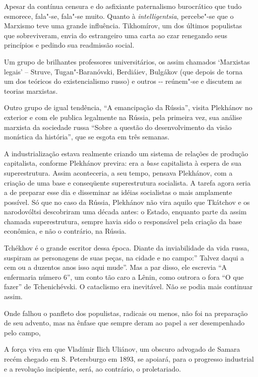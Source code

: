 Apesar da contínua censura e do asfixiante paternalismo burocrático que
tudo esmorece, fala"-se, fala"-se muito. Quanto à \emph{intelligentsia},
percebe"-se que o Marxismo teve uma grande influência. Tikhomírov, um dos
últimos populistas que sobreviveram, envia do estrangeiro uma carta ao
czar renegando seus princípios e pedindo sua readmissão social.

Um grupo de brilhantes professores universitários, os assim chamados
`Marxistas legais' -- Struve, Tugan"-Baranóvski, Berdiáiev, Bulgákov (que
depois de torna um dos teóricos do existencialismo russo) e outros -\/-
reúnem"-se e discutem as teorias marxistas.

Outro grupo de igual tendência, ``A emancipação da Rússia'', visita
Plekhánov no exterior e com ele publica legalmente na Rússia, pela
primeira vez, sua análise marxista da sociedade russa ``Sobre a questão
do desenvolvimento da visão monística da história'', que se esgota em
três semanas.

A industrialização estava realmente criando um sistema de relações de
produção capitalista, conforme Plekhánov previra: era a \emph{base}
capitalista à espera de sua superestrutura. Assim aconteceria, a seu
tempo, pensava Plekhánov, com a criação de uma base e conseqüente
superestrutura socialista. A tarefa agora seria a de preparar esse dia e
disseminar as idéias socialistas o mais amplamente possível. Só que no
caso da Rússia, Plekhánov não vira aquilo que Tkátchov e os narodovóltsi
descobriram uma década antes: o Estado, enquanto parte da assim chamada
superestrutura, sempre havia sido o responsável pela criação da base
econômica, e não o contrário, na Rússia.

Tchékhov é o grande escritor dessa época. Diante da inviabilidade da
vida russa, suspiram as personagens de suas peças, na cidade e no
campo:'' Talvez daqui a cem ou a duzentos anos isso aqui mude''. Mas a
par disso, ele escrevia ``A enfermaria número 6'', um conto tão caro a
Lênin, como outrora o fora ``O que fazer'' de Tchenichévski. O
cataclismo era inevitável. Não se podia mais continuar assim.

Onde falhou o panfleto dos populistas, radicais ou menos, não foi na
preparação de seu advento, mas na ênfase que sempre deram ao papel a ser
desempenhado pelo campo,

A força viva em que Vladímir Ilich Uliánov, um obscuro advogado de
Samara recém chegado em S. Petersburgo em 1893, se apoiará, para o
progresso industrial e a revolução incipiente, será, ao contrário, o
proletariado.

